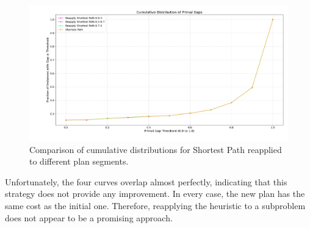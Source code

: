 \begin{figure}[h!]
	\centering
	\includegraphics[width=\textwidth]{images/sp_full.png}
	\caption{Comparison of cumulative distributions for Shortest Path reapplied to different plan segments.}
	\label{fig:reapply}
\end{figure}

Unfortunately, the four curves overlap almost perfectly, indicating that this strategy does not provide any improvement.
In every case, the new plan has the same cost as the initial one. Therefore, reapplying the heuristic to a subproblem does not appear
to be a promising approach.
